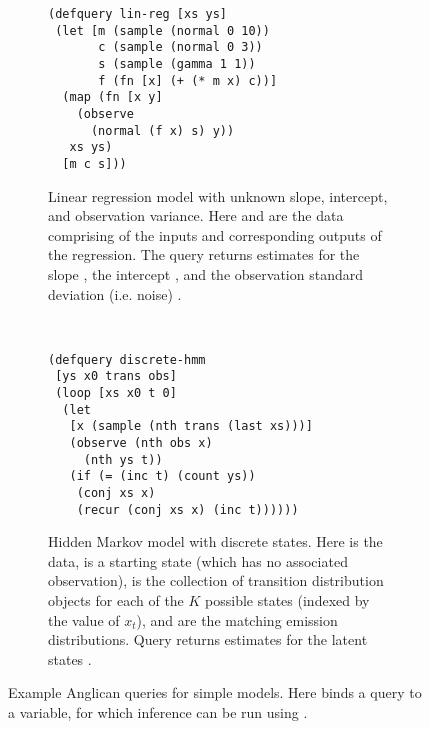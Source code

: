 \begin{figure}[t]
	\centering
	\begin{subfigure}[t]{0.45\textwidth}
			\centering	
\begin{lstlisting}[basicstyle=\ttfamily\footnotesize]
(defquery lin-reg [xs ys]
 (let [m (sample (normal 0 10))  
       c (sample (normal 0 3))
       s (sample (gamma 1 1))
       f (fn [x] (+ (* m x) c))]
  (map (fn [x y]
    (observe 
      (normal (f x) s) y))
   xs ys)
  [m c s]))
\end{lstlisting}				
			\caption{Linear regression model with unknown slope, intercept, and
				observation variance.  Here  and
	  are the data comprising of the inputs and corresponding
	 outputs of the regression.  The query returns estimates
	 for the slope , the intercept , and the observation
	 standard deviation (i.e. noise) . \label{fig:probprog:lregang}
		}
	\end{subfigure}
~~
	\begin{subfigure}[t]{0.52\textwidth}
		\centering	
\begin{lstlisting}[basicstyle=\ttfamily\footnotesize]
(defquery discrete-hmm
 [ys x0 trans obs]
 (loop [xs x0 t 0]
  (let 
   [x (sample (nth trans (last xs)))]
   (observe (nth obs x) 
     (nth ys t))
   (if (= (inc t) (count ys))
    (conj xs x)
    (recur (conj xs x) (inc t))))))
\end{lstlisting}	
		\caption{Hidden Markov model with discrete states.
	Here  is the data,  is a starting state (which
	has no associated observation),  is the collection of 
	transition distribution objects for each of the $K$ possible states
	(indexed by the value of $x_t$), and  are the matching
	emission distributions.	Query returns
	estimates for the latent states .\label{fig:probprog:hmm}
		 }
	\end{subfigure}
	\vspace{5pt}
		\caption{Example Anglican queries for simple models. Here 
			binds a query to a variable, for which inference can be run using
			{\footnotesize {}}. 
			\label{fig:probprog:example-ang}}
\end{figure}

